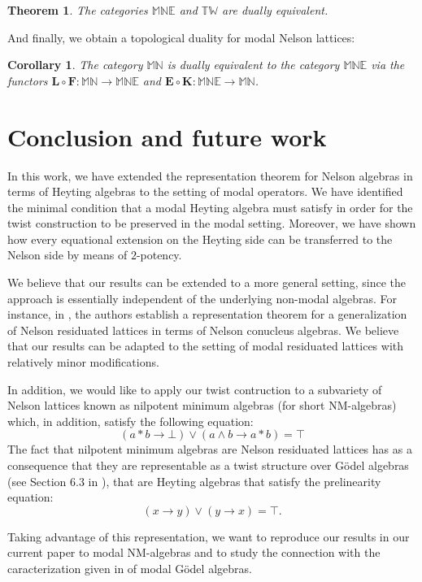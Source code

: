\documentclass[pdflatex,sn-mathphys-num]{sn-jnl}%
\newtheorem{corollary}{Corollary}
\newcommand{\MN}{\mathbb{MN}}
\theoremstyle{thmstyleone}%
\newtheorem{theorem}{Theorem}%
\theoremstyle{thmstyletwo}%
\theoremstyle{thmstylethree}%
\begin{document}
\begin{theorem}
    The categories $\mathbb{MNE}$ and $\mathbb{TW}$ are dually equivalent.
\end{theorem}

And finally, we obtain a topological duality for modal Nelson lattices:
\begin{corollary}
    The category $\MN$ is dually equivalent to the category $\mathbb{MNE}$ via the functors $\mathbf{L} \circ\mathbf{F}\colon \mathbb{MN}\to \mathbb{MNE}$ and $\mathbf{E}\circ \mathbf{K}: \mathbb{MNE}\to \MN$.
\end{corollary}


\section{Conclusion and future work}\label{sec10}
In this work, we have extended the representation theorem for Nelson algebras in terms of Heyting algebras to the setting of modal operators. We have identified the minimal condition that a modal Heyting algebra must satisfy in order for the twist construction to be preserved in the modal setting. Moreover, we have shown how every equational extension on the Heyting side can be transferred to the Nelson side by means of $2$-potency. 

We believe that our results can be extended to a more general setting, since the approach is essentially independent of the underlying non-modal algebras. For instance, in \cite{Busaniche2}, the authors establish a representation theorem for a generalization of Nelson residuated lattices in terms of Nelson conucleus algebras. We believe that our results can be adapted to the setting of modal residuated lattices with relatively minor modifications. 

In addition, we would like to apply our twist contruction to a subvariety of Nelson lattices known as nilpotent minimum algebras (for short NM-algebras) which, in addition, satisfy the following equation:
\begin{equation*}
(a * b \to \bot) \vee (a \wedge b \to a * b) = \top 
\end{equation*}
The fact that nilpotent minimum algebras are Nelson residuated lattices has as a consequence that they are representable as a twist structure over G\"odel algebras (see Section 6.3 in \cite{Busaniche}), that are Heyting algebras that satisfy the prelinearity equation:
\[(x\rightarrow y)\vee (y\rightarrow x)=\top.
\]

Taking advantage of this representation, we want to reproduce our results in our current paper to modal NM-algebras and to study the connection with the caracterization given in \cite{CaiRod2015} of modal G\"odel algebras.
\end{document}
